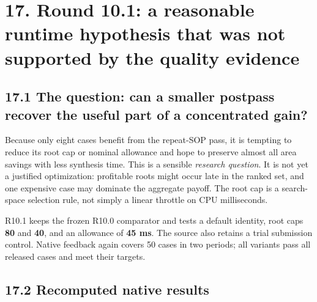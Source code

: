 \documentclass[a4paper,10pt]{article}
\theoremstyle{definition}
\theoremstyle{remark}
\begin{document}
\section{17. Round 10.1: a reasonable runtime hypothesis that was not supported by the quality evidence}\label{round-10.1-a-reasonable-runtime-hypothesis-that-was-not-supported-by-the-quality-evidence}

\subsection{17.1 The question: can a smaller postpass recover the useful part of a concentrated gain?}\label{the-question-can-a-smaller-postpass-recover-the-useful-part-of-a-concentrated-gain}

Because only eight cases benefit from the repeat-SOP pass, it is tempting to reduce its root cap or nominal allowance and hope to preserve almost all area savings with less synthesis time. This is a sensible \emph{research question}. It is not yet a justified optimization: profitable roots might occur late in the ranked set, and one expensive case may dominate the aggregate payoff. The root cap is a search-space selection rule, not simply a linear throttle on CPU milliseconds.

R10.1 keeps the frozen R10.0 comparator and tests a default identity, root caps \textbf{80} and \textbf{40}, and an allowance of \textbf{45 ms}. The source also retains a trial submission control. Native feedback again covers 50 cases in two periods; all variants pass all released cases and meet their targets.

\subsection{17.2 Recomputed native results}\label{recomputed-native-results}
\end{document}
